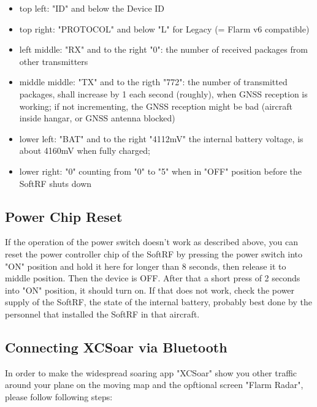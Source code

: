 \documentclass[11pt,a4paper]{article}
\begin{document}
\begin{itemize}
\item top left: "ID" and below the Device ID
\item top right: "PROTOCOL" and below "L" for Legacy (= Flarm v6 compatible)
\item left middle: "RX" and to the right "0": the number of received packages from other transmitters
\item middle middle: "TX" and to the rigth "772": the number of transmitted packages, shall increase by 1 each second (roughly), when GNSS reception is working; if not incrementing, the GNSS reception might be bad (aircraft inside hangar, or GNSS antenna blocked)
\item lower left: "BAT" and to the right "4112mV" the internal battery voltage, is about 4160mV when fully charged;
\item lower right: "0" counting from "0" to "5" when in "OFF" position before the SoftRF shuts down
\end{itemize}

\subsection{Power Chip Reset}\label{power_reset}
If the operation of the power switch doesn't work as described above, you can reset the power controller chip of the SoftRF by pressing the power switch into "ON" position and hold it here for longer than 8 seconds, then release it to middle position. Then the device is OFF. After that a short press of 2 seconds into "ON" position, it should turn on. If that does not work, check the power supply of the SoftRF, the state of the internal battery, probably best done by the personnel that installed the SoftRF in that aircraft.

\subsection{Connecting XCSoar via Bluetooth}
In order to make the widespread soaring app "XCSoar" show you other traffic around your plane on the moving map and the opftional screen "Flarm Radar", please follow following steps:
\end{document}
